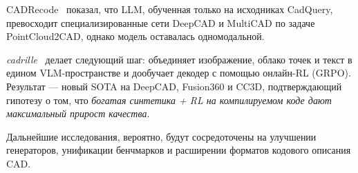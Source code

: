 CADRecode~\cite{rukhovich24_cadrecode} показал, что LLM, обученная только на
исходниках CadQuery, превосходит специализированные сети DeepCAD и MultiCAD по
задаче PointCloud2CAD, однако модель оставалась одномодальной.

\textit{cadrille}~\cite{kolodiazhnyi25_cadrille} делает следующий шаг:
объединяет изображение, облако точек и текст в едином VLM-пространстве
и дообучает декодер с помощью онлайн-RL (GRPO). Результат — новый
SOTA на DeepCAD, Fusion360 и CC3D, подтверждающий гипотезу о том, что
\textit{богатая синтетика + RL на компилируемом коде дают максимальный
	прирост качества}.

Дальнейшие исследования, вероятно, будут сосредоточены на улучшении
генераторов, унификации бенчмарков и расширении форматов кодового
описания CAD.

\newpage